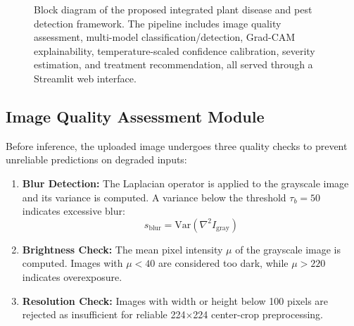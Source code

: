 \documentclass[conference]{IEEEtran}
\begin{document}
\begin{figure}[htbp]
\caption{Block diagram of the proposed integrated plant disease and pest detection framework. The pipeline includes image quality assessment, multi-model classification/detection, Grad-CAM explainability, temperature-scaled confidence calibration, severity estimation, and treatment recommendation, all served through a Streamlit web interface.}
\label{fig:system_arch}
\end{figure}

\subsection{Image Quality Assessment Module}

Before inference, the uploaded image undergoes three quality checks to prevent unreliable predictions on degraded inputs:

\begin{enumerate}
    \item \textbf{Blur Detection:} The Laplacian operator is applied to the grayscale image and its variance is computed. A variance below the threshold $\tau_b = 50$ indicates excessive blur:
    \begin{equation}
        s_{\text{blur}} = \mathrm{Var}\!\left(\nabla^2 I_{\text{gray}}\right)
    \end{equation}
    
    \item \textbf{Brightness Check:} The mean pixel intensity $\mu$ of the grayscale image is computed. Images with $\mu < 40$ are considered too dark, while $\mu > 220$ indicates overexposure.
    
    \item \textbf{Resolution Check:} Images with width or height below 100 pixels are rejected as insufficient for reliable 224$\times$224 center-crop preprocessing.
\end{enumerate}
\end{document}
